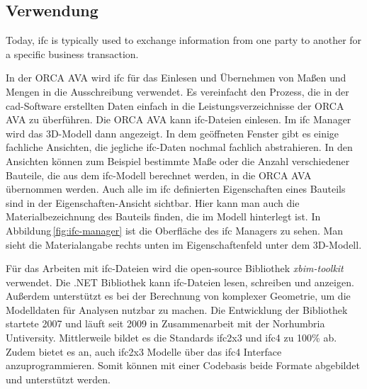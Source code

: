 \subsection{Verwendung}
\label{c:basics:ifc:usage}
\begin{displayquote}
	\glqq Today, \ac{ifc} is typically used to exchange information from one party to another for a specific business transaction.\grqq{} \citep{BuildingSMART_IFC}
\end{displayquote}
In der ORCA AVA wird \ac{ifc} für das Einlesen und Übernehmen von Maßen und Mengen in die Ausschreibung verwendet. Es vereinfacht den Prozess, die in der \ac{cad}-Software erstellten Daten einfach in die Leistungsverzeichnisse der ORCA AVA zu überführen.
Die ORCA AVA kann \ac{ifc}-Dateien einlesen. Im \ac{ifc} Manager wird das 3D-Modell dann angezeigt. In dem geöffneten Fenster gibt es einige fachliche Ansichten, die jegliche \ac{ifc}-Daten nochmal fachlich abstrahieren. In den Ansichten können zum Beispiel bestimmte Maße oder die Anzahl verschiedener Bauteile, die aus dem \ac{ifc}-Modell berechnet werden, in die ORCA AVA übernommen werden. Auch alle im \ac{ifc} definierten Eigenschaften eines Bauteils sind in der Eigenschaften-Ansicht sichtbar. Hier kann man auch die Materialbezeichnung des Bauteils finden, die im Modell hinterlegt ist. In Abbildung\,\ref{fig:ifc-manager} ist die Oberfläche des \ac{ifc} Managers zu sehen. Man sieht die Materialangabe rechts unten im Eigenschaftenfeld unter dem 3D-Modell.

Für das Arbeiten mit \ac{ifc}-Dateien wird die open-source Bibliothek \textit{xbim-toolkit} verwendet. Die .NET Bibliothek kann \ac{ifc}-Dateien lesen, schreiben und anzeigen. Außerdem unterstützt es bei der Berechnung von komplexer Geometrie, um die Modelldaten für Analysen nutzbar zu machen. Die Entwicklung der Bibliothek startete 2007 und läuft seit 2009 in Zusammenarbeit mit der Norhumbria Untiversity. Mittlerweile bildet es die Standards \ac{ifc2x3} und \ac{ifc4} zu 100\% ab. Zudem bietet es an, auch \ac{ifc2x3} Modelle über das \ac{ifc4} Interface anzuprogrammieren. Somit können mit einer Codebasis beide Formate abgebildet und unterstützt werden. \citep{Xbim_ltd_history}


